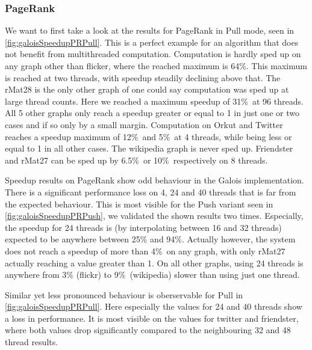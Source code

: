 \subsubsection{PageRank}
We want to first take a look at the results for PageRank in Pull mode, seen in \autoref{fig:galoisSpeedupPRPull}. This is a perfect example for an algorithm that does not benefit from multithreaded computation.
Computation is hardly sped up on any graph other than flicker, where the reached maximum is 64\%. This maximum is reached at two threads, with speedup steadily declining above that.
The rMat28 is the only other graph of one could say computation was sped up at large thread counts. Here we reached a maximum speedup of 31\%\ at 96 threads.
All 5 other graphs only reach a speedup greater or equal to 1 in just one or two cases and if so only by a small margin.
Computation on Orkut and Twitter reaches a speedup maximum of 12\%\ and 5\%\ at 4 threads, while being less or equal to 1 in all other cases.
The wikipedia graph is never sped up.
Friendster and rMat27 can be sped up by 6.5\%\ or 10\%\ respectively on 8 threads.

Speedup results on PageRank show odd behaviour in the Galois implementation.
There is a significant performance loss on 4, 24 and 40 threads that is far from the expected behaviour. This is most visible for the Push variant seen in \autoref{fig:galoisSpeedupPRPush}, we validated the shown results two times.
Especially, the speedup for 24 threads is (by interpolating between 16 and 32 threads) expected to be anywhere between 25\% and 94\%.
Actually however, the system does not reach a speedup of more than 4\%\ on any graph, with only rMat27 actually reaching a value greater than 1.
On all other graphs, using 24 threads is anywhere from 3\% (flickr) to 9\%\ (wikipedia) slower than using just one thread.

Similar yet less pronounced behaviour is oberservable for Pull in \autoref{fig:galoisSpeedupPRPull}.
Here especially the values for 24 and 40 threads show a loss in performance.
It is most visible on the values for twitter and friendster, where both values drop significantly compared to the neighbouring 32 and 48 thread results.

